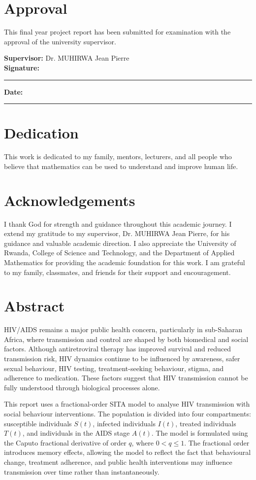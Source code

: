 \documentclass[12pt,a4paper,oneside]{report}
\begin{document}
\chapter*{Approval}
This final year project report has been submitted for examination with the approval of the university supervisor.

\vspace{1.2cm}
\noindent\textbf{Supervisor:} Dr. MUHIRWA Jean Pierre\\[8pt]
\textbf{Signature:} \rule{6cm}{0.4pt}\hfill\textbf{Date:} \rule{3.5cm}{0.4pt}

\chapter*{Dedication}
This work is dedicated to my family, mentors, lecturers, and all people who believe that mathematics can be used to understand and improve human life.

\chapter*{Acknowledgements}
I thank God for strength and guidance throughout this academic journey. I extend my gratitude to my supervisor, Dr. MUHIRWA Jean Pierre, for his guidance and valuable academic direction. I also appreciate the University of Rwanda, College of Science and Technology, and the Department of Applied Mathematics for providing the academic foundation for this work. I am grateful to my family, classmates, and friends for their support and encouragement.

\chapter*{Abstract}
HIV/AIDS remains a major public health concern, particularly in sub-Saharan Africa, where transmission and control are shaped by both biomedical and social factors. Although antiretroviral therapy has improved survival and reduced transmission risk, HIV dynamics continue to be influenced by awareness, safer sexual behaviour, HIV testing, treatment-seeking behaviour, stigma, and adherence to medication. These factors suggest that HIV transmission cannot be fully understood through biological processes alone.

This report uses a fractional-order SITA model to analyse HIV transmission with social behaviour interventions. The population is divided into four compartments: susceptible individuals $S(t)$, infected individuals $I(t)$, treated individuals $T(t)$, and individuals in the AIDS stage $A(t)$. The model is formulated using the Caputo fractional derivative of order $q$, where $0<q\leq 1$. The fractional order introduces memory effects, allowing the model to reflect the fact that behavioural change, treatment adherence, and public health interventions may influence transmission over time rather than instantaneously.
\end{document}
